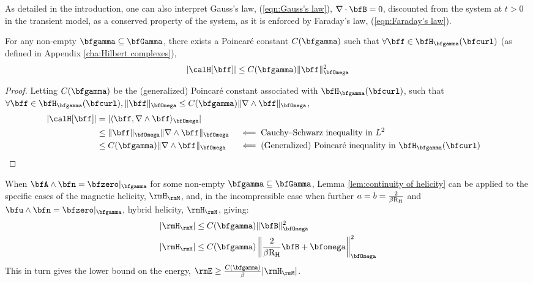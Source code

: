     As detailed in the introduction, one can also interpret Gauss's law, (\ref{eqn:Gauss's law}), $\nabla\cdot\bfB  =  0$, discounted from the system at $t  >  0$ in the transient model, as a conserved property of the system, as it is enforced by Faraday's law, (\ref{eqn:Faraday's law}).

    \line

    \begin{lemma}\label{lem:continuity of helicity}
        For any non-empty $\bfgamma  \subseteq  \bfGamma$, there exists a Poincaré constant $C(\bfgamma)$ such that $\forall  \bff  \in  \bfH_{\bfgamma}(\bfcurl)$ (as defined in Appendix \ref{cha:Hilbert complexes}),
        \begin{equation}
            |\calH[\bff]|  \leq  C(\bfgamma)\|\bff\|_{\bfOmega}^{2}
        \end{equation}
    \end{lemma}
    \begin{proof}
        Letting $C(\bfgamma)$ be the (generalized) Poincaré constant associated with $\bfH_{\bfgamma}(\bfcurl)$, such that $\forall \bff \in \bfH_{\bfgamma}(\bfcurl), \|\bff\|_{\bfOmega}  \leq  C(\bfgamma)\|\nabla\wedge\bff\|_{\bfOmega}$,
        \begin{align}
            |\calH[\bff]|  &=  |\langle\bff, \nabla\wedge\bff\rangle_{\bfOmega}|  \\
            &\leq  \|\bff\|_{\bfOmega}\|\nabla\wedge\bff\|_{\bfOmega}  &&\impliedby  \text{Cauchy--Schwarz inequality in } L^{2}  \\
            &\leq  C(\bfgamma)\|\nabla\wedge\bff\|_{\bfOmega}  &&\impliedby  \text{(Generalized) Poincaré inequality in } \bfH_{\bfgamma}(\bfcurl)
        \end{align}
    \end{proof}

    \begin{corollary}
        When $\bfA\wedge\bfn  =  \bfzero|_{\bfgamma}$ for some non-empty $\bfgamma  \subseteq  \bfGamma$, Lemma \ref{lem:continuity of helicity} can be applied to the specific cases of the magnetic helicity, $\rmH_{\rmM}$, \BA{[Ref]} and, in the incompressible case when further $a  =  b  =  \frac{2}{\beta\mathrm{R}_{\mathrm{H}}}$ and $\bfu\wedge\bfn  =  \bfzero|_{\bfgamma}$, hybrid helicity, $\rmH_{\rmH}$, \cite{Laakmann_Hu_Farrell_2022} giving:
        \begin{align}
            |\rmH_{\rmM}|  &\leq  C(\bfgamma)\|\bfB\|_{\bfOmega}^{2}  \\
            |\rmH_{\rmH}|  &\leq  C(\bfgamma)\left\|\frac{2}{\beta\rmRH}\bfB + \bfomega\right\|_{\bfOmega}^{2}
        \end{align}
        This in turn gives the lower bound on the energy, $\rmE  \geq  \frac{C(\bfgamma)}{\beta}|\rmH_{\rmM}|$.
    \end{corollary}

